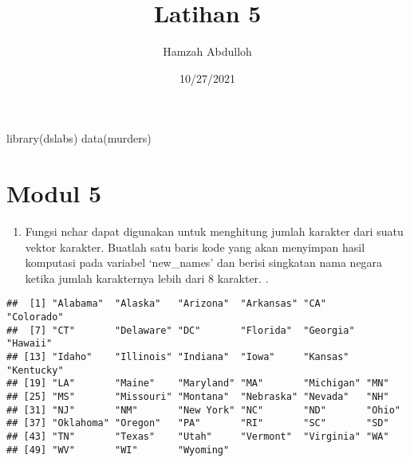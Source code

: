 \documentclass[
]{article}
\title{Latihan 5}
\author{Hamzah Abdulloh}
\date{10/27/2021}
\newenvironment{Shaded}{\begin{snugshade}}{\end{snugshade}}
\newcommand{\DecValTok}[1]{\textcolor[rgb]{0.00,0.00,0.81}{#1}}
\newcommand{\FunctionTok}[1]{\textcolor[rgb]{0.00,0.00,0.00}{#1}}
\newcommand{\NormalTok}[1]{#1}
\newcommand{\OtherTok}[1]{\textcolor[rgb]{0.56,0.35,0.01}{#1}}
\newcommand{\SpecialCharTok}[1]{\textcolor[rgb]{0.00,0.00,0.00}{#1}}
\providecommand{\tightlist}{%
  \setlength{\itemsep}{0pt}\setlength{\parskip}{0pt}}
\begin{document}
\maketitle

\begin{Shaded}
\begin{Highlighting}[]
\FunctionTok{library}\NormalTok{(dslabs)}
\FunctionTok{data}\NormalTok{(murders) }
\end{Highlighting}
\end{Shaded}

\hypertarget{modul-5}{%
\section{Modul 5}\label{modul-5}}

\begin{enumerate}
\def\labelenumi{\arabic{enumi}.}
\tightlist
\item
  Fungsi nchar dapat digunakan untuk menghitung jumlah karakter dari
  suatu vektor karakter. Buatlah satu baris kode yang akan menyimpan
  hasil komputasi pada variabel `new\_names' dan berisi singkatan nama
  negara ketika jumlah karakternya lebih dari 8 karakter. .
\end{enumerate}

\begin{Shaded}
\end{Shaded}

\begin{verbatim}
##  [1] "Alabama"  "Alaska"   "Arizona"  "Arkansas" "CA"       "Colorado"
##  [7] "CT"       "Delaware" "DC"       "Florida"  "Georgia"  "Hawaii"  
## [13] "Idaho"    "Illinois" "Indiana"  "Iowa"     "Kansas"   "Kentucky"
## [19] "LA"       "Maine"    "Maryland" "MA"       "Michigan" "MN"      
## [25] "MS"       "Missouri" "Montana"  "Nebraska" "Nevada"   "NH"      
## [31] "NJ"       "NM"       "New York" "NC"       "ND"       "Ohio"    
## [37] "Oklahoma" "Oregon"   "PA"       "RI"       "SC"       "SD"      
## [43] "TN"       "Texas"    "Utah"     "Vermont"  "Virginia" "WA"      
## [49] "WV"       "WI"       "Wyoming"
\end{verbatim}
\end{document}

